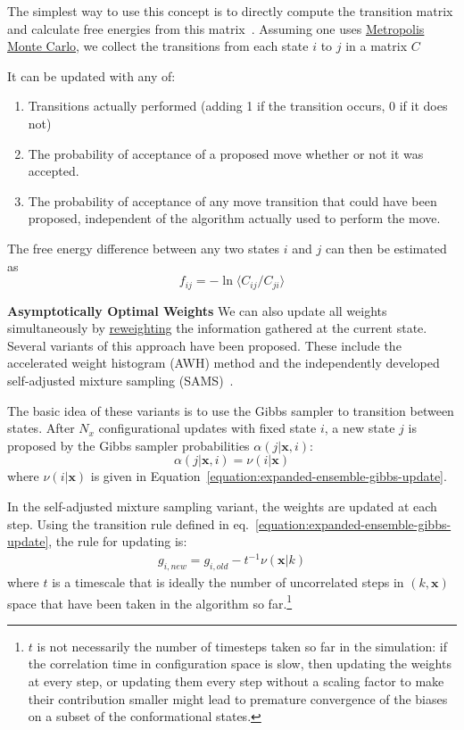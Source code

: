 \documentclass[9pt,review]{livecoms}
\newcommand{\vx}{\mathbf{x}}
\begin{document}
The simplest way to use this concept is to directly compute the transition matrix and calculate free energies from this matrix~\cite{siderius_2013}. Assuming one uses \hyperlink{ref:MetropolisMonteCarlo} {Metropolis Monte Carlo}, we collect the transitions from each state $i$ to $j$ in a matrix $C$

It can be updated with any of:
\begin{enumerate}
\item Transitions actually performed (adding 1 if the transition occurs, 0 if it does not)\label{item:actual}
\item The probability of acceptance of a proposed move whether or not it was accepted.\label{item:proposal}
\item The probability of acceptance of any move transition that could have been proposed, independent of the algorithm actually used to perform the move. \label{item:transition}
\end{enumerate}

The free energy difference between any two states $i$ and $j$ can then be estimated as
\begin{equation}
f_{ij} = - \ln \langle C_{ij}/C_{ji} \rangle
\label{eq:transitionmc}
\end{equation}

\textbf{Asymptotically Optimal Weights}
We can also update all weights simultaneously by \hyperlink{ref:Reweighting} {reweighting} the
information gathered at the current state.   Several variants of this approach have been proposed. These include the accelerated weight histogram (AWH) method
\cite{Lidmar2012} and the independently developed self-adjusted mixture sampling (SAMS)~\cite{tan_optimally_2017}.

The basic idea of these variants is to use the Gibbs sampler to transition between states. After $N_x$ configurational updates with fixed state $i$, a new state $j$ is proposed by the Gibbs sampler probabilities $\alpha(j|\vx, i)$:
\begin{equation}\label{eq:gibbsproposal}
  \alpha(j|\vx, i) = \nu(i|\vx)
\end{equation}
where $\nu(i|\vx)$ is given in Equation~\ref{equation:expanded-ensemble-gibbs-update}.

In the self-adjusted mixture sampling variant, the weights are updated at each step. Using the transition rule defined in eq.~\ref{equation:expanded-ensemble-gibbs-update}, the rule for updating is:
\begin{eqnarray}
g_{i,new} = g_{i,old} - t^{-1}\nu(\vx|k)
\end{eqnarray}
where $t$ is a timescale that is ideally the number of uncorrelated steps in $(k,\vx)$ space that have been taken in the algorithm so far.\footnote{$t$ is not necessarily the number of timesteps taken so far in the simulation: if the correlation time in configuration space is slow, then updating the weights at every step, or updating them every step without a scaling factor to make their contribution smaller might lead to premature convergence of the biases on a subset of the conformational states.}
\end{document}
